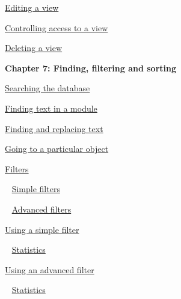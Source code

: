 \documentclass[11pt,a4paper]{article}
\begin{document}
\href{https://www.ibm.com/support/knowledgecenter/search/Editing%20a%20view?scope=SSYQBZ_9.6.1}{Editing a view}

\href{https://www.ibm.com/support/knowledgecenter/search/Controlling%20access%20to%20a%20view?scope=SSYQBZ_9.6.1}{Controlling access to a view}

\href{https://www.ibm.com/support/knowledgecenter/search/Deleting%20a%20view?scope=SSYQBZ_9.6.1}{Deleting a view} \\

\newpage

\begin{Large}\textbf{Chapter 7: Finding, filtering and sorting} \end{Large} 
\vspace{1mm}

\href{https://www.ibm.com/support/knowledgecenter/search/Searching%20the%20database?scope=SSYQBZ_9.6.1}{Searching the database}

\href{https://www.ibm.com/support/knowledgecenter/search/Finding%20text%20in%20a%20module?scope=SSYQBZ_9.6.1}{Finding text in a module}

\href{https://www.ibm.com/support/knowledgecenter/search/Finding%20and%20replacing%20text?scope=SSYQBZ_9.6.1}{Finding and replacing text}

\href{https://www.ibm.com/support/knowledgecenter/search/Going%20to%20a%20particular%20object?scope=SSYQBZ_9.6.1}{Going to a particular object}

\href{https://www.ibm.com/support/knowledgecenter/search/Filters?scope=SSYQBZ_9.6.1}{Filters}

\,\,\, \href{https://www.ibm.com/support/knowledgecenter/search/Simple%20filters?scope=SSYQBZ_9.6.1}{Simple filters}

\,\,\, \href{https://www.ibm.com/support/knowledgecenter/search/Advanced%20filters?scope=SSYQBZ_9.6.1}{Advanced filters}

\href{https://www.ibm.com/support/knowledgecenter/search/Using%20a%20simple%20filter?scope=SSYQBZ_9.6.1}{Using a simple filter}

\,\,\, \href{https://www.ibm.com/support/knowledgecenter/search/Statistics?scope=SSYQBZ_9.6.1}{Statistics}

\href{https://www.ibm.com/support/knowledgecenter/search/Using%20an%20advanced%20filter?scope=SSYQBZ_9.6.1}{Using an advanced filter}

\,\,\, \href{https://www.ibm.com/support/knowledgecenter/search/Statistics?scope=SSYQBZ_9.6.1}{Statistics}
\end{document}
